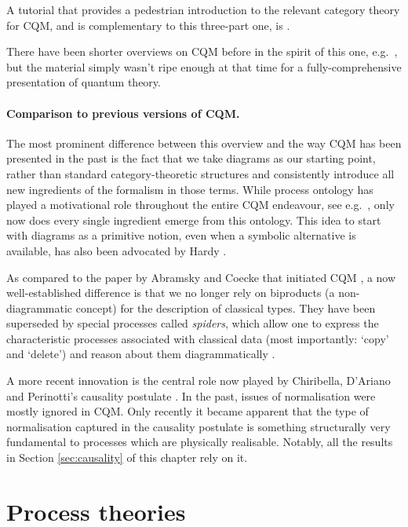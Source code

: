 \documentclass[10pt]{article}
\begin{document}
A tutorial that provides a pedestrian introduction to the relevant category theory for CQM, and is complementary to this three-part one, is \cite{CatsII}.   
  
There have been shorter overviews on CQM before in the spirit of this one, e.g.~\cite{Kindergarten, ContPhys}, but the material simply wasn't ripe enough at that time for a fully-comprehensive presentation of quantum theory. 

\paragraph{Comparison to previous versions of CQM.}  The most prominent difference between this overview and the way CQM has been presented in the past is the fact that we take diagrams as our starting point, rather than standard category-theoretic structures and consistently introduce all new ingredients of the formalism in those terms.  While process ontology has played a motivational role throughout the entire CQM endeavour, see e.g.~\cite{JTF}, only now does every single ingredient emerge from this ontology.  This idea to start with diagrams as a primitive notion, even when a symbolic alternative is available, has also been advocated by Hardy \cite{HardyJTF}.

As compared to the paper by Abramsky and Coecke that initiated CQM \cite{AC1}, a  now well-established difference is  that we no longer rely on biproducts  (a non-diagrammatic concept) for the description of classical types.  They have been superseded  by special processes called \textit{spiders},  which allow one to express the characteristic processes associated with classical data (most importantly: `copy' and `delete') and reason about them diagrammatically \cite{CPav, CPaqpav}.

A more recent  innovation is the central role  now played by Chiribella, D'Ariano and Perinotti's causality postulate \cite{chiri1}.  In the past, issues of normalisation were mostly ignored in CQM.  Only recently it became apparent that the type of normalisation captured in the causality postulate is something structurally very fundamental  to processes which are physically realisable. Notably, all the results in Section \ref{sec:causality} of this chapter rely on it.  


\section{Process theories}
\end{document}
